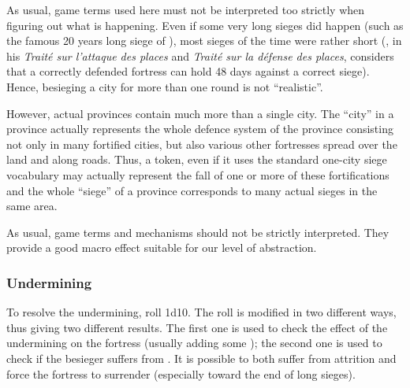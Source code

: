 \begin{designnote}
  As usual, game terms used here must not be interpreted too strictly when
  figuring out what is happening. Even if some very long sieges did happen
  (such as the famous 20 years long siege of ), most sieges of
  the time were rather short (, in his \emph{Traité sur
    l'attaque des places} and \emph{Traité sur la défense des places},
  considers that a correctly defended fortress can hold 48 days against a
  correct siege). Hence, besieging a city for more than one round is not
  ``realistic''.

  However, actual provinces contain much more than a single city. The ``city''
  in a province actually represents the whole defence system of the province
  consisting not only in many fortified cities, but also various other
  fortresses spread over the land and along roads. Thus, a \USURE token, even
  if it uses the standard one-city siege vocabulary may actually represent the
  fall of one or more of these fortifications and the whole ``siege'' of a
  province corresponds to many actual sieges in the same area.

  As usual, game terms and mechanisms should not be strictly interpreted. They
  provide a good macro effect suitable for our level of abstraction.
\end{designnote}

\subsubsection{Undermining}
To resolve the undermining, roll 1d10. The roll is modified in two different
ways, thus giving two different results. The first one is used to check the
effect of the undermining on the fortress (usually adding some \USURE); the
second one is used to check if the besieger suffers from . It is possible to both suffer from attrition and force the
fortress to surrender (especially toward the end of long sieges).


